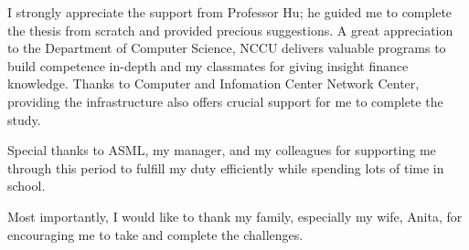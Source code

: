 
\begin{acknowledgementsen}
I strongly appreciate the support from Professor Hu; he guided me to complete the thesis from scratch and provided precious suggestions. A great appreciation to the Department of Computer Science, NCCU delivers valuable programs to build competence in-depth and my classmates for giving insight finance knowledge. Thanks to Computer and Infomation Center Network Center, providing the infrastructure also offers crucial support for me to complete the study.

Special thanks to ASML, my manager, and my colleagues for supporting me through this period to fulfill my duty efficiently while spending lots of time in school.

Most importantly, I would like to thank my family, especially my wife, Anita, for encouraging me to take and complete the challenges.

\end{acknowledgementsen}
